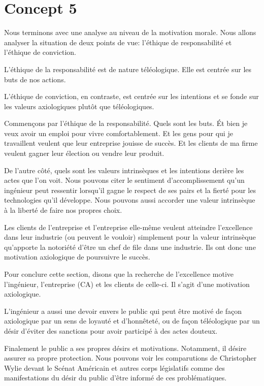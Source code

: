 \documentclass[11pt]{article}
\newcommand{\philnewpage}{}
\begin{document}
\philnewpage
\section{Concept 5}

Nous terminons avec une analyse au niveau de la motivation morale.  Nous allons
analyser la situation de deux points de vue: l'éthique de responsabilité et
l'éthique de conviction.

L'éthique de la responsabilité est de nature téléologique.  Elle est centrée sur
les buts de nos actions.

L'éthique de conviction, en contraste, est centrée sur les intentions et se
fonde sur les valeurs axiologiques plutôt que téléologiques.

Commençons par l'éthique de la responsabilité.  Quels sont les buts.  Ét bien je
veux avoir un emploi pour vivre comfortablement.  Et les gens pour qui je
travaillent veulent que leur entreprise jouisse de succès.  Et les clients de ma
firme veulent gagner leur élection ou vendre leur produit.

De l'autre côté, quels sont les valeurs intrinsèques et les intentions derière
les actes que l'on voit.  Nous pouvons citer le sentiment d'accomplissement
qu'un ingénieur peut ressentir lorsqu'il gagne le respect de ses pairs et la
fierté pour les technologies qu'il développe.  Nous pouvons aussi accorder une
valeur intrinsèque à la liberté de faire nos propres choix.

Les clients de l'entreprise et l'entreprise elle-même veulent atteindre
l'excellence dans leur industrie (ou peuvent le vouloir) simplement pour la
valeur intrinsèque qu'apporte la notoriété d'être un chef de file dans une
industrie.  Ils ont donc une motivation axiologique de poursuivre le succès.

Pour conclure cette section, disons que la recherche de l'excellence motive
l'ingénieur, l'entreprise (CA) et les clients de celle-ci.  Il s'agit d'une
motivation axiologique.

L'ingénieur a aussi une devoir envers le public qui peut être motivé de façon
axiologique par un sens de loyauté et d'honnêteté, ou de façon téléologique par
un désir d'éviter des sanctions pour avoir participé à des actes douteux.

Finalement le public a ses propres désirs et motivations.  Notamment, il désire
assurer sa propre protection.  Nous pouvons voir les comparutions de Christopher
Wylie devant le Scénat Américain et autres corps législatifs comme des
manifestations du désir du public d'être informé de ces problématiques.
\end{document}
